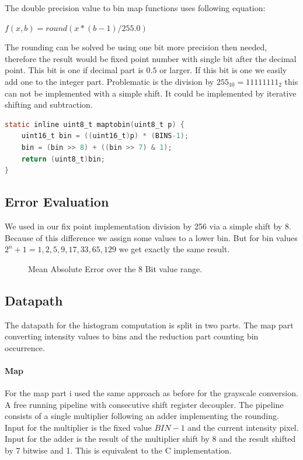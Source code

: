 \documentclass[a4paper]{scrartcl}
\begin{document}
The double precision value to bin map functions uses following equation: 

$f(x,b) = round(x*(b-1)/255.0)$

The rounding can be solved be using one bit more precision then needed, therefore the result would be fixed point number with single bit after the decimal point. This bit is one if decimal part is $0.5$ or larger. If this bit is one we easily add one to the integer part. Problematic is the division by $255_{10}=11111111_2$ this can not be implemented with a simple shift. It could be implemented by iterative shifting and subtraction. 

\begin{minipage}{\linewidth}
\begin{lstlisting}[language=C]
static inline uint8_t maptobin(uint8_t p) {
	uint16_t bin = ((uint16_t)p) * (BINS-1);
	bin = (bin >> 8) + ((bin >> 7) & 1);
	return (uint8_t)bin;
}
\end{lstlisting}
\end{minipage}

\subsection{Error Evaluation}

We used in our fix point implementation division by 256 via a simple shift by 8. Because of this difference we assign some values to a lower bin. But for bin values $2^n+1 = {1,2,5,9,17,33,65,129}$ we get exactly the same result.
\begin{figure}[h!]
	\centering
	\caption{Mean Absolute Error over the 8 Bit value range.}
\end{figure}

\subsection{Datapath}

The datapath for the histogram computation is split in two parts. The map part converting intensity values to bins and the reduction part counting bin occurrence. 

\paragraph{Map}

For the map part i used the same approach as before for the grayscale conversion. A free running pipeline with consecutive shift register decoupler. The pipeline consists of a single multiplier following an adder implementing the rounding. Input for the multiplier is the fixed value $BIN-1$ and the current intensity pixel. Input for the adder is the result of the multiplier shift by 8 and the result shifted by 7 bitwise and 1. This is equivalent to the C implementation. 
\end{document}
